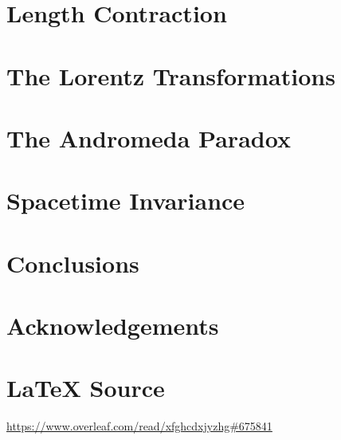 \documentclass{article}
\theoremstyle{definition}
\begin{document}
\section{Length Contraction}
\label{section:lenght_contraction}
%
%
%
\section{The Lorentz Transformations}
\label{section:the_lorentz_transformations}
%
%
%
\section{The Andromeda Paradox}
\label{section:the_andromeda_paradox}
%
%
%
\section{Spacetime Invariance}
\label{section:spacetime_invariance}
%
%
%
\section{Conclusions}
\label{section:conclusions}
%
%
%
\section*{Acknowledgements}
\label{section:acknowledgements}
%
%
\section*{\LaTeX \hspace{0.025 mm} Source}
\url{https://www.overleaf.com/read/xfghcdxjyzhg#675841}
%
%
%


%
%
%
%
%
\end{document}
